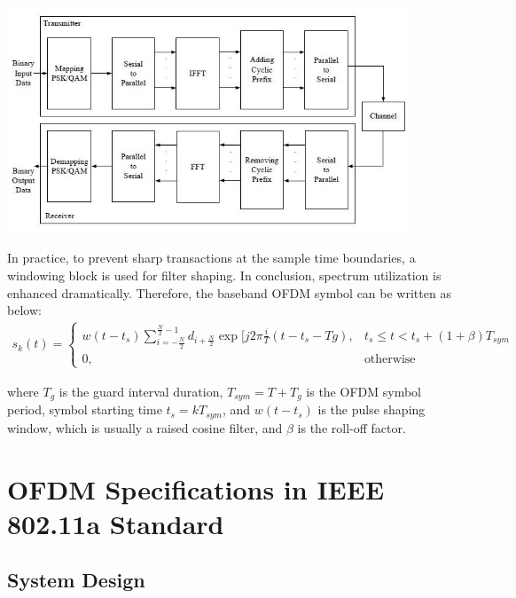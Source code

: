 \begin{center}
\includegraphics[width=12cm]{content/fig/basic_ofdm_design.JPG}
\label{fig:basic_ofdm}
\end{center}

In practice, to prevent sharp transactions at the sample time boundaries, a windowing block is used for filter shaping. In conclusion, spectrum utilization is enhanced dramatically. Therefore, the baseband OFDM symbol can be written as below:\\
\begin{equation} \label{ofdm_window}
\begin{split}
s_{k}(t)=
\left\{
	\begin{array}{ll}
	w(t - t_{s})\sum\limits_{i=-\frac{N}{2}}^{\frac{N}{2}-1} d_{i+\frac{N}{2}} \exp\lbrack j2\pi\frac{i}{T}(t- t_{s}- T{g}) , & t_{s}\le t < t_{s} + (1+\beta)T_{sym}\\
	0, & \mbox{otherwise}
	\end{array}
\right.
\end{split}
\end{equation}

where $T_{g}$ is the guard interval duration, $T_{sym}= T+ T_{g}$ is the OFDM symbol period,
symbol starting time $t_{s}= kT_{sym}$, and $w(t-t_{s})$ is the pulse shaping window, which is
usually a raised cosine filter, and $\beta$ is the roll-off factor.\\


\section{OFDM Specifications in IEEE 802.11a Standard}
\subsection{System Design}

